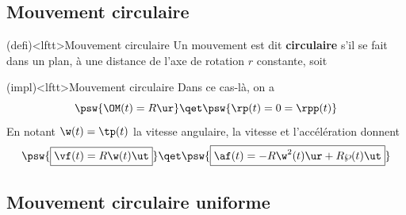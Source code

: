 \documentclass[../../main/main.tex]{subfiles}
\begin{document}
\subsection{Mouvement circulaire}

\begin{tcb*}(defi)<lftt>{Mouvement circulaire}
	Un mouvement est dit \textbf{circulaire} s'il se fait dans un plan, à une
	distance de l'axe de rotation $r$ constante, soit
	\psw{%
		\[
			r(t) = \cte = R
		\]
	}%
	\vspace{-25pt}
\end{tcb*}

\begin{tcb}(impl)<lftt>{Mouvement circulaire}
	Dans ce cas-là, on a
	\[
		\psw{\OM(t) = R\ur}
		\qet
		\psw{\rp(t) = 0 = \rpp(t)}
	\]
	En notant $\w(t) = \tp(t)$ la vitesse angulaire, la vitesse et l'accélération
	donnent
	\[
		\psw{\boxed{\vf(t) = R\w(t)\ut}}
		\qet
		\psw{\boxed{\af(t) = -R\w^2(t)\ur + R\wp(t)\ut}}
	\]
	\vspace{-25pt}
\end{tcb}


\vspace{-20pt}

\subsection{Mouvement circulaire uniforme}

\vspace{-15pt}
\end{document}

